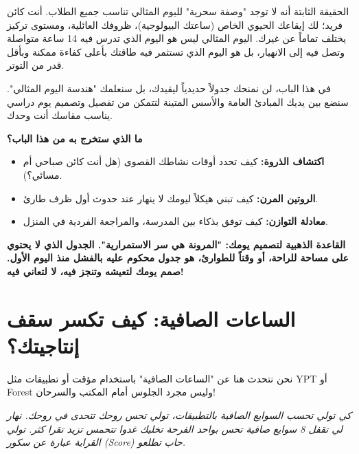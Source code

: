 \documentclass[12pt,a4paper]{book}
\newcommand{\quoteAr}[1]{%
	\begin{myquote}
		\itshape #1
	\end{myquote}
}
\newcommand{\importantAr}[1]{%
	\begin{important}
		\bfseries #1
	\end{important}
}
\begin{document}
	الحقيقة الثابتة أنه لا توجد "وصفة سحرية" لليوم المثالي تناسب جميع الطلاب. أنت كائن فريد؛ لك إيقاعك الحيوي الخاص (ساعتك البيولوجية)، ظروفك العائلية، ومستوى تركيز يختلف تماماً عن غيرك. اليوم المثالي ليس هو اليوم الذي تدرس فيه 14 ساعة متواصلة وتصل فيه إلى الانهيار، بل هو اليوم الذي تستثمر فيه طاقتك بأعلى كفاءة ممكنة وبأقل قدر من التوتر.
	
	في هذا الباب، لن نمنحك جدولاً حديدياً ليقيدك، بل سنعلمك "هندسة اليوم المثالي". سنضع بين يديك المبادئ العامة والأسس المتينة لتتمكن من تفصيل وتصميم يوم دراسي يناسب مقاسك أنت وحدك.
	
	\textbf{ما الذي ستخرج به من هذا الباب؟}
	\begin{itemize}
		\item \textbf{اكتشاف الذروة:} كيف تحدد أوقات نشاطك القصوى (هل أنت كائن صباحي أم مسائي؟).
		\item \textbf{الروتين المرن:} كيف تبني هيكلاً ليومك لا ينهار عند حدوث أول ظرف طارئ.
		\item \textbf{معادلة التوازن:} كيف توفق بذكاء بين المدرسة، والمراجعة الفردية في المنزل.
	\end{itemize}
	
	\importantAr{القاعدة الذهبية لتصميم يومك: "المرونة هي سر الاستمرارية". الجدول الذي لا يحتوي على مساحة للراحة، أو وقتاً للطوارئ، هو جدول محكوم عليه بالفشل منذ اليوم الأول. صمم يومك لتعيشه وتنجز فيه، لا لتعاني فيه!}
	
	\section{ الساعات الصافية: كيف تكسر سقف إنتاجيتك؟}
	\label{sec:owner-experiences7}
	
	 نحن نتحدث هنا عن "الساعات الصافية" باستخدام مؤقت أو تطبيقات مثل YPT أو Forest وليس مجرد الجلوس أمام المكتب والسرحان!
	
	\quoteAr{كي تولي تحسب السوايع الصافية بالتطبيقات، تولي تحس روحك تتحدى في روحك. نهار لي تقفل 8 سوايع صافية تحس بواحد الفرحة تخليك غدوا تتحمس تزيد تقرا كثر. تولي القراية عبارة عن سكور (Score) حاب تطلعو.}
	
\end{document}
